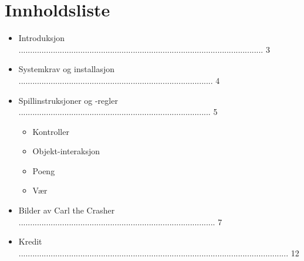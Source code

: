 \documentclass[paper=a4]{article}
\begin{document}
\section{Innholdsliste}
\begin{itemize}
	\item Introduksjon ........................................................................................................... 3
	\item Systemkrav og installasjon ..................................................................................... 4
	\item Spillinstruksjoner og -regler .................................................................................... 5
		\begin{itemize} 
			\item Kontroller
			\item Objekt-interaksjon
			\item Poeng
			\item Vær
		\end{itemize}
	\item Bilder av Carl the Crasher ...................................................................................... 7
	\item Kredit ...................................................................................................................... 12
\end{itemize}
\newpage
\end{document}
